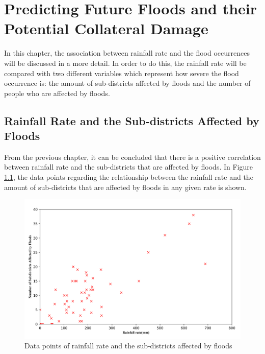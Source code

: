 \chapter{Predicting Future Floods and their Potential Collateral Damage}

In this chapter, the association between rainfall rate and the flood occurrences will be discussed in a more detail. In order to do this, the rainfall rate will be compared with two different variables which represent how severe the flood occurrence is: the amount of sub-districts affected by floods and the number of people who are affected by floods.

\section{Rainfall Rate and the Sub-districts Affected by Floods}

From the previous chapter, it can be concluded that there is a positive correlation between rainfall rate and the sub-districts that are affected by floods. In Figure \ref{fig=corrrainsub.png}, the data points regarding the relationship between the rainfall rate and the amount of sub-districts that are affected by floods in any given rate is shown.\\

\begin{figure}
\begin{center}
\graphicspath{ {./Pict/} }
\includegraphics[scale=0.15]{corrrainsub.png}
\caption{Data points of rainfall rate and the sub-districts affected by floods}\label{fig=corrrainsub.png}
\end{center}
\end{figure}

